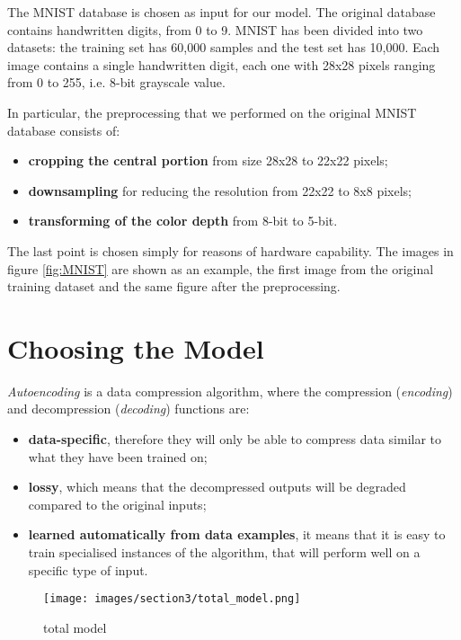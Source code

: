 \documentclass{article}
\begin{document}
\par The MNIST database is chosen as input for our model.
The original database contains handwritten digits, from 0 to 9. 
MNIST has been divided into two datasets: the training set has 60,000 samples and the test set has 10,000.
Each image contains a single handwritten digit, each one with 28x28 pixels 
ranging from 0 to 255, i.e. 8-bit grayscale value.
\par In particular, the preprocessing that we performed on the original MNIST database consists of:
\begin{itemize}
    \item \textbf{cropping the central portion} from size 28x28 to 22x22 pixels;
    \item \textbf{downsampling} for reducing the resolution from 22x22 to 8x8 pixels;
    \item \textbf{transforming of the color depth} from 8-bit to 5-bit.
\end{itemize}

The last point is chosen simply for reasons of hardware capability.
The images in figure \ref{fig:MNIST} are shown as an example, the first image from the original training dataset
and the same figure after the preprocessing.



\section{Choosing the Model}
\textit{Autoencoding} is a data compression algorithm, where the compression (\textit{encoding}) and decompression (\textit{decoding}) functions are:
\begin{itemize}
  \item \textbf{data-specific}, therefore they will only be able to compress data similar to what they have been trained on;
  \item \textbf{lossy}, which means that the decompressed outputs will be degraded compared to the original inputs;
  \item \textbf{learned automatically from data examples}, it means that it is easy to train specialised instances of the algorithm, 
          that will perform well on a specific type of input.
\end{itemize}


\begin{figure}[H]
  \centering
  \texttt{[image: images/section3/total\_model.png]}
  \caption{total model}
  \label{fig:classifier}
  \end{figure}
\end{document}
